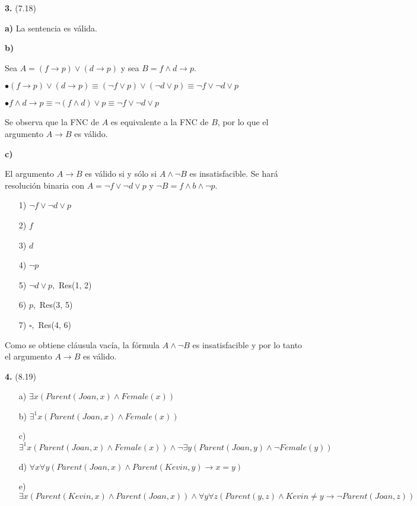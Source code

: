 \documentclass{article}
\begin{document}
\textbf{3.} (7.18)

\textbf{a)} La sentencia es válida.

\textbf{b)}

Sea $A = (f \rightarrow p) \lor (d \rightarrow p)$ y sea $B = f \land d \rightarrow p$.

$\bullet (f \rightarrow p) \lor (d \rightarrow p) \equiv (\lnot f \lor p) \lor (\lnot d \lor p) \equiv \lnot f \lor \lnot d \lor p$

$\bullet f \land d \rightarrow p \equiv \lnot (f \land d) \lor p \equiv \lnot f \lor \lnot d \lor p$

Se observa que la FNC de $A$ es equivalente a la FNC de $B$, por lo que el argumento $A \rightarrow B$ es válido.

\textbf{c)}

El argumento $A \rightarrow B$ es válido si y sólo si $A \land \lnot B$ es insatisfacible. Se hará resolución binaria con $A = \lnot f \lor \lnot d \lor p$ y $\lnot B = f \land b \land \lnot p$.

\begin{itemize}
\item[1)] $\lnot f \lor \lnot d \lor p$
\item[2)] $f$
\item[3)] $d$
\item[4)] $\lnot p$
\item[5)] $\lnot d \lor p,$ Res(1, 2)
\item[6)] $p,$ Res(3, 5)
\item[7)] $\square,$ Res(4, 6)
\end{itemize}

Como se obtiene cláusula vacía, la fórmula $A \land \lnot B$ es insatisfacible y por lo tanto el argumento $A \rightarrow B$ es válido.

\textbf{4.} (8.19)

\begin{itemize}
\item[a)] $\exists x (Parent(Joan, x) \land Female(x))$
\item[b)] $\exists^1 x (Parent(Joan, x) \land Female(x))$
\item[c)] $\exists^1 x (Parent(Joan, x) \land Female(x)) \land \lnot \exists y (Parent(Joan, y) \land \lnot Female(y))$
\item[d)] $\forall x \forall y (Parent(Joan, x) \land Parent(Kevin, y) \rightarrow x=y)$
\item[e)] $\exists x (Parent(Kevin, x) \land Parent(Joan, x)) \land \forall y \forall z (Parent(y,z) \land Kevin \neq y \rightarrow \lnot Parent(Joan, z))$
\end{itemize}
\end{document}
